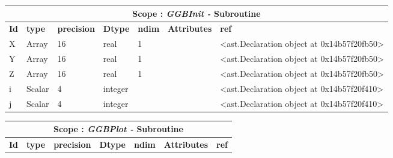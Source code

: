 \documentclass{report}
\begin{document}
 \vspace{1cm}

\begin{center}
\begin{longtable}{|p{3.5cm}|p{1.5cm}|p{1.5cm}|p{1.5cm}|p{1cm}|p{2cm}|p{4cm}| }
\hline
\multicolumn{7}{|c|}{\textbf{Scope : \qquad}  \textbf{\textit{GGBInit - }Subroutine}}\\ 
\hline
\textbf{Id} & \textbf{type} & \textbf{precision} & \textbf{Dtype} & \textbf{ndim} & \textbf{Attributes} & \textbf{ref} \\\hline

X & Array & 16 & real & 1 &  & <ast.Declaration object at 0x14b57f20fb50> \\\hline

Y & Array & 16 & real & 1 &  & <ast.Declaration object at 0x14b57f20fb50> \\\hline

Z & Array & 16 & real & 1 &  & <ast.Declaration object at 0x14b57f20fb50> \\\hline

i & Scalar & 4 & integer &  &  & <ast.Declaration object at 0x14b57f20f410> \\\hline

j & Scalar & 4 & integer &  &  & <ast.Declaration object at 0x14b57f20f410> \\\hline

\end{longtable}
\end{center}

 \vspace{1cm}

\begin{center}
\begin{longtable}{|p{3.5cm}|p{1.5cm}|p{1.5cm}|p{1.5cm}|p{1cm}|p{2cm}|p{4cm}| }
\hline
\multicolumn{7}{|c|}{\textbf{Scope : \qquad}  \textbf{\textit{GGBPlot - }Subroutine}}\\ 
\hline
\textbf{Id} & \textbf{type} & \textbf{precision} & \textbf{Dtype} & \textbf{ndim} & \textbf{Attributes} & \textbf{ref} \\\hline

\end{longtable}
\end{center}

 \vspace{1cm}
\end{document}
